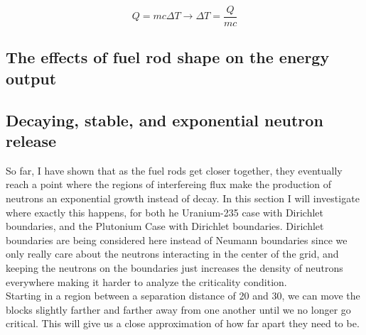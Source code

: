 \documentclass[letterpaper, 12pt]{article}
\newcommand{\eqlabel}[1]{\label{eq:#1}}
\begin{document}
         \begin{equation}
            Q = mc \Delta T \longrightarrow \Delta T = \frac{Q}{mc}
            \eqlabel{Chemistry}
         \end{equation}

      \subsection{The effects of fuel rod shape on the energy output}
      \subsection{Decaying, stable, and exponential neutron release}
         So far, I have shown that as the fuel rods get closer together, they eventually reach a point where the regions of interfereing flux make the production of neutrons an exponential growth instead of decay. In this section I will investigate where exactly this happens, for both he Uranium-235 case with Dirichlet boundaries, and the Plutonium Case with Dirichlet boundaries. Dirichlet boundaries are being considered here instead of Neumann boundaries since we only really care about the neutrons interacting in the center of the grid, and keeping the neutrons on the boundaries just increases the density of neutrons everywhere making it harder to analyze the criticality condition.\\

         Starting in a region between a separation distance of 20 and 30, we can move the blocks slightly farther and farther away from one another until we no longer go critical. This will give us a close approximation of how far apart they need to be.
\end{document}
